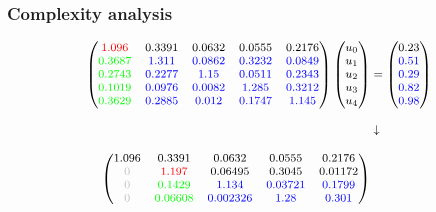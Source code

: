\documentclass{beamer}
\begin{document}

\begin{frame}[fragile]
  \frametitle{Complexity analysis}
$$
{\footnotesize
\begin{aligned}
      \begin{pmatrix}
\textcolor{red}{1.096} & \textcolor{black}{0.3391} & \textcolor{black}{0.0632} & \textcolor{black}{0.0555} & \textcolor{black}{0.2176}\\
\textcolor{green}{0.3687} & \textcolor{blue}{1.311} & \textcolor{blue}{0.0862} & \textcolor{blue}{0.3232} & \textcolor{blue}{0.0849}\\
\textcolor{green}{0.2743} & \textcolor{blue}{0.2277} & \textcolor{blue}{1.15} & \textcolor{blue}{0.0511} & \textcolor{blue}{0.2343}\\
\textcolor{green}{0.1019} & \textcolor{blue}{0.0976} & \textcolor{blue}{0.0082} & \textcolor{blue}{1.285} & \textcolor{blue}{0.3212}\\
\textcolor{green}{0.3629} & \textcolor{blue}{0.2885} & \textcolor{blue}{0.012} & \textcolor{blue}{0.1747} & \textcolor{blue}{1.145}
\end{pmatrix}
\begin{pmatrix}
u_0 \\ u_1 \\ u_2 \\ u_3 \\ u_4
\end{pmatrix}
&=
\begin{pmatrix}
\textcolor{black}{0.23}\\
\textcolor{blue}{0.51}\\
\textcolor{blue}{0.29}\\
\textcolor{blue}{0.82}\\
\textcolor{blue}{0.98}
\end{pmatrix}\\[2ex]
&\downarrow\\[2ex]
    \begin{pmatrix}
1.096 & 0.3391 & 0.0632 & 0.0555 & 0.2176\\
\textcolor{lightgray}{0} & \textcolor{red}{1.197} & \textcolor{black}{0.06495} & \textcolor{black}{0.3045} & \textcolor{black}{0.01172}\\
\textcolor{lightgray}{0} & \textcolor{green}{0.1429} & \textcolor{blue}{1.134} & \textcolor{blue}{0.03721} & \textcolor{blue}{0.1799}\\
\textcolor{lightgray}{0} & \textcolor{green}{0.06608} & \textcolor{blue}{0.002326} & \textcolor{blue}{1.28} & \textcolor{blue}{0.301}\\

\end{pmatrix}
\end{aligned}}$$
\end{frame}
\end{document}
